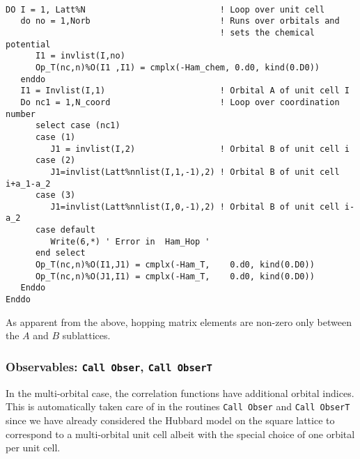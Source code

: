 \documentclass{SciPost}
\begin{document}
\begin{lstlisting}

DO I = 1, Latt%N                           ! Loop over unit cell 
   do no = 1,Norb                          ! Runs over orbitals and 
                                           ! sets the chemical potential
      I1 = invlist(I,no)  
      Op_T(nc,n)%O(I1 ,I1) = cmplx(-Ham_chem, 0.d0, kind(0.D0))
   enddo
   I1 = Invlist(I,1)                       ! Orbital A of unit cell I
   Do nc1 = 1,N_coord                      ! Loop over coordination  number
      select case (nc1)
      case (1)
         J1 = invlist(I,2)                 ! Orbital B of unit cell i
      case (2)
         J1=invlist(Latt%nnlist(I,1,-1),2) ! Orbital B of unit cell i+a_1-a_2
      case (3)
         J1=invlist(Latt%nnlist(I,0,-1),2) ! Orbital B of unit cell i-a_2 
      case default
         Write(6,*) ' Error in  Ham_Hop '  
      end select
      Op_T(nc,n)%O(I1,J1) = cmplx(-Ham_T,    0.d0, kind(0.D0))   
      Op_T(nc,n)%O(J1,I1) = cmplx(-Ham_T,    0.d0, kind(0.D0))
   Enddo
Enddo

\end{lstlisting}
As apparent from the above, hopping matrix elements   are non-zero only between the $A$ and $B$  sublattices. 
%
\subsubsection{Observables:  \texttt{Call Obser},   \texttt{Call ObserT}}
%
In the multi-orbital case,  the correlation functions have additional orbital indices. This is automatically taken care of in the routines \texttt{Call Obser} and \texttt{Call ObserT}  since  we have already considered the  Hubbard model on the square lattice to correspond to a multi-orbital unit cell albeit with the special choice of one orbital per unit cell. 
%
\end{document}
